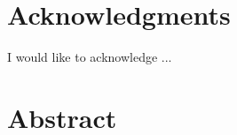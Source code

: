 \documentclass[12pt,english]{report}
\begin{document}
\newpage
\bgroup
\titleformat{\chapter}{}{}{0pt}{\normalfont\Large\bfseries}
\titlespacing*{\chapter}{0pt}{0pt}{20pt}
\chapter*{Acknowledgments}
\egroup
{}%

\begin{onehalfspace}

I would like to acknowledge ...

\end{onehalfspace}

\newpage

\begin{singlespace}
{
\hypersetup{linkcolor=black}
\tableofcontents
}
\end{singlespace}
\newpage

{
\hypersetup{linkcolor=black}
\listoftables
}
\newpage

{
\hypersetup{linkcolor=black}
\listoffigures
}
\newpage


\renewcommand{\nomname}{Nomenclature}
\begin{singlespace}
\printnomenclature[3cm] %
\end{singlespace}

\newpage
\bgroup
\titleformat{\chapter}{}{}{0pt}{\normalfont\Large\bfseries}
\titlespacing*{\chapter}{0pt}{0pt}{20pt}
\chapter*{Abstract}
\egroup
{}%

\begin{onehalfspace}

\noindent %
\blindtext

\end{onehalfspace}
\end{document}
